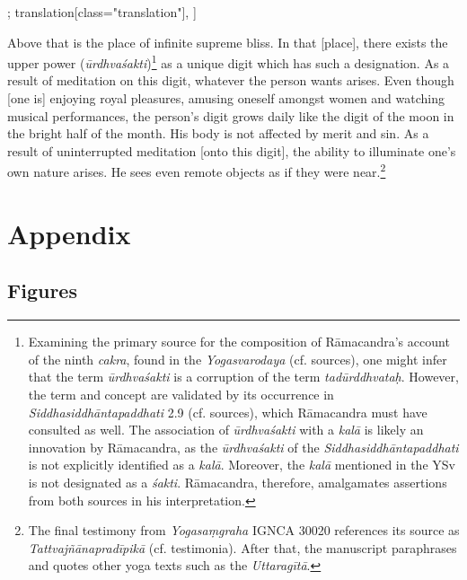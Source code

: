\begin{alignment}[
  texts=edition[class="edition"];
  translation[class="translation"],
  ]
\begin{translation}
\begin{tlate}[p12_03]
      Above that is the place of infinite supreme bliss. In that [place], there exists the upper power (\textit{ūrdhvaśakti})\footnote{Examining the primary source for the composition of Rāmacandra's account of the ninth \textit{cakra}, found in the \emph{Yogasvarodaya} (cf. sources), one might infer that the term \textit{ūrdhvaśakti} is a corruption of the term \textit{tadūrddhvataḥ}. However, the term and concept are validated by its occurrence in \emph{Siddhasiddhāntapaddhati} 2.9 (cf. sources), which Rāmacandra must have consulted as well. The association of \textit{ūrdhvaśakti} with a \textit{kalā} is likely an innovation by Rāmacandra, as the \textit{ūrdhvaśakti} of the \emph{Siddhasiddhāntapaddhati}  is not explicitly identified as a \textit{kalā}. Moreover, the \textit{kalā} mentioned in the YSv is not designated as a \textit{śakti}. Rāmacandra, therefore, amalgamates assertions from both sources in his interpretation.} as a unique digit which has such a designation. As a result of meditation on this digit, whatever the person wants arises. Even though [one is] enjoying royal pleasures, amusing oneself amongst women and watching musical performances, the person's digit grows daily like the digit of the moon in the bright half of the month. His body is not affected by merit and sin. As a result of uninterrupted meditation [onto this digit], the ability to illuminate one's own nature arises. He sees even remote objects as if they were near.\footnote{The final testimony from \textit{Yogasaṃgraha} IGNCA 30020 references its source as \textit{Tattvajñānapradīpikā} (cf. testimonia). After that, the manuscript paraphrases and quotes other yoga texts such as the \emph{Uttaragītā}.}
\flushpage 
      \end{tlate}
    \end{translation}
  \end{alignment}
  \pagebreak %
\cleardoublepage
{}
\chapter{Appendix}
\section{Figures}
 
\clearpage


